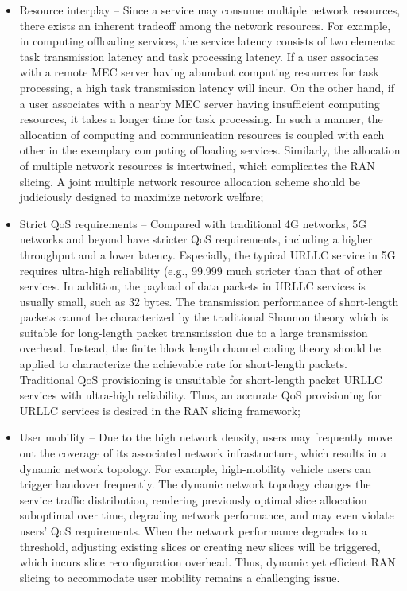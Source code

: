 \documentclass{article}
\begin{document}
\begin{itemize}
\item 
Resource interplay – Since a service may consume multiple network resources, there exists an inherent tradeoff
among the network resources. For example, in computing offloading services, the service latency consists of
two elements: task transmission latency and task processing latency. If a user associates with a remote MEC
server having abundant computing resources for task
processing, a high task transmission latency will incur.
On the other hand, if a user associates with a nearby
MEC server having insufficient computing resources, it
takes a longer time for task processing. In such a manner, the allocation of computing and communication resources is coupled with each other in the exemplary computing offloading services. Similarly, the allocation of
multiple network resources is intertwined, which complicates the RAN slicing. A joint multiple network resource allocation scheme should be judiciously designed
to maximize network welfare; 
\item  Strict QoS requirements – Compared with traditional 4G
networks, 5G networks and beyond have stricter QoS
requirements, including a higher throughput and a lower
latency. Especially, the typical URLLC service in 5G
requires ultra-high reliability (e.g., 99.999%
much stricter than that of other services. In addition, the
payload of data packets in URLLC services is usually
small, such as 32 bytes. The transmission performance of short-length packets cannot be characterized
by the traditional Shannon theory which is suitable for
long-length packet transmission due to a large transmission overhead. Instead, the finite block length channel coding theory should be applied to characterize the
achievable rate for short-length packets. Traditional
QoS provisioning is unsuitable for short-length packet
URLLC services with ultra-high reliability. Thus, an accurate QoS provisioning for URLLC services is desired
in the RAN slicing framework; 
\item  User mobility – Due to the high network density, users
may frequently move out the coverage of its associated network infrastructure, which results in a dynamic
network topology. For example, high-mobility vehicle
users can trigger handover frequently. The dynamic network topology changes the service traffic distribution,
rendering previously optimal slice allocation suboptimal
over time, degrading network performance, and may
even violate users’ QoS requirements. When the network
performance degrades to a threshold, adjusting existing
slices or creating new slices will be triggered, which
incurs slice reconfiguration overhead. Thus, dynamic yet
efficient RAN slicing to accommodate user mobility remains a challenging issue.\cite{aiNS}
\end{itemize}
\end{document}
